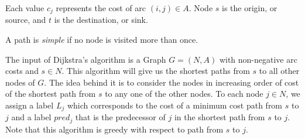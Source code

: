 \documentclass[12pt, a4paper]{report}
\newtheorem[style=M,bodystyle=\normalfont]{theorem}{Theorem}
\newtheorem[style=M,bodystyle=\normalfont]{corollary}{Corollary}
\newtheorem[style=M,bodystyle=\normalfont]{lemma}{Lemma}
\newtheorem[style=M,bodystyle=\normalfont]{definition}{Definition}
\begin{document}
    Each value $c_j$ represents the cost  of arc $(i,j) \in A$. Node $s$ is the origin, or source, and $t$ is the destination, or sink. 
    \begin{definition}
        A path is \emph{simple} if no node is visited more than once. 
    \end{definition}
    The input of Dijkstra's algorithm is a Graph $G = (N, A)$ with non-negative arc costs and $s \in N$. This algorithm will give us the shortest paths from $s$ to 
    all other nodes of $G$. The idea behind it is to consider the nodes in increasing order of cost of the shortest path from $s$ to any one of the other nodes. 
    To each node $j \in N$, we assign a label $L_j$ which corresponds to the cost of a minimum cost path from $s$ to $j$ and a label $pred_j$ that is the predecessor of $j$ in the
    shortest path from $s$ to $j$. Note that this algorithm is greedy with respect to path from $s$ to $j$. 
\end{document}
